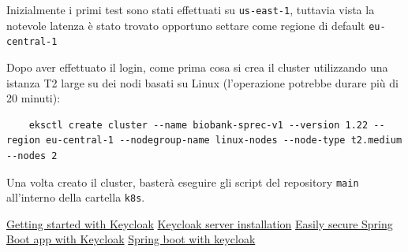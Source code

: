 \documentclass{article}
\begin{document}
Inizialmente i primi test sono stati effettuati su \texttt{us-east-1}, tuttavia vista la notevole latenza è stato trovato opportuno settare come regione di default \texttt{eu-central-1}

Dopo aver effettuato il login, come prima cosa si crea il cluster utilizzando una istanza T2 large su dei nodi basati su Linux (l'operazione potrebbe durare più di 20 minuti):

\begin{verbatim}
    eksctl create cluster --name biobank-sprec-v1 --version 1.22 --region eu-central-1 --nodegroup-name linux-nodes --node-type t2.medium --nodes 2
\end{verbatim}

Una volta creato il cluster, basterà eseguire gli script del repository \texttt{main} all'interno della cartella \texttt{k8s}.


\pagebreak

\begin{thebibliography}{4}
     \href{https://www.keycloak.org/docs/11.0/getting_started/}{Getting started with Keycloak}
     \href{https://www.keycloak.org/docs/latest/server_installation/}{Keycloak server installation}
     \href{https://www.keycloak.org/2017/05/easily-secure-your-spring-boot.html}{Easily secure Spring Boot app with Keycloak}
     \href{https://www.baeldung.com/spring-boot-keycloak}{Spring boot with keycloak}

\end{thebibliography}


\pagebreak
\end{document}
